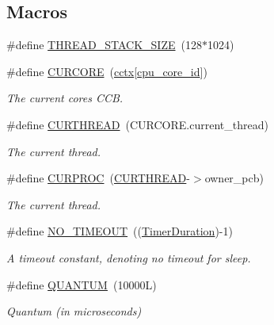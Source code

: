 \subsection*{Macros}
\begin{DoxyCompactItemize}
\item 
\#define \hyperlink{group__scheduler_ga90b7a8cb7bc3fdbd98014a3e15ee6e9a}{T\+H\+R\+E\+A\+D\+\_\+\+S\+T\+A\+C\+K\+\_\+\+S\+I\+ZE}~(128$\ast$1024)
\item 
\mbox{\label{group__scheduler_ga869aabe01f7b28027376354dd895b96b}} 
\#define \hyperlink{group__scheduler_ga869aabe01f7b28027376354dd895b96b}{C\+U\+R\+C\+O\+RE}~(\hyperlink{group__scheduler_ga3be3b151b275926dff3fb99bee765eab}{cctx}\mbox{[}\hyperlink{bios_8h_abac58ced7d51f54f2318b326bc991933}{cpu\+\_\+core\+\_\+id}\mbox{]})
\begin{DoxyCompactList}\small\item\em The current core\textquotesingle{}s C\+CB. \end{DoxyCompactList}\item 
\#define \hyperlink{group__scheduler_ga587a82c8931f0df72f43cc913ceb7e27}{C\+U\+R\+T\+H\+R\+E\+AD}~(C\+U\+R\+C\+O\+R\+E.\+current\+\_\+thread)
\begin{DoxyCompactList}\small\item\em The current thread. \end{DoxyCompactList}\item 
\#define \hyperlink{group__scheduler_gae3437e8e6787ef05b6576d03c5b6a0ca}{C\+U\+R\+P\+R\+OC}~(\hyperlink{group__scheduler_ga587a82c8931f0df72f43cc913ceb7e27}{C\+U\+R\+T\+H\+R\+E\+AD}-\/$>$owner\+\_\+pcb)
\begin{DoxyCompactList}\small\item\em The current thread. \end{DoxyCompactList}\item 
\mbox{\label{group__scheduler_ga462fb2ba6f2af99ec3d021ded436bb65}} 
\#define \hyperlink{group__scheduler_ga462fb2ba6f2af99ec3d021ded436bb65}{N\+O\+\_\+\+T\+I\+M\+E\+O\+UT}~((\hyperlink{bios_8h_ae7291e5cd742fb9bc6d4aaa0d51bd0ee}{Timer\+Duration})-\/1)
\begin{DoxyCompactList}\small\item\em A timeout constant, denoting no timeout for sleep. \end{DoxyCompactList}\item 
\#define \hyperlink{group__scheduler_gabc4f0f9abea1b5443308e4ea84b52b21}{Q\+U\+A\+N\+T\+UM}~(10000\+L)
\begin{DoxyCompactList}\small\item\em Quantum (in microseconds) \end{DoxyCompactList}\end{DoxyCompactItemize}

